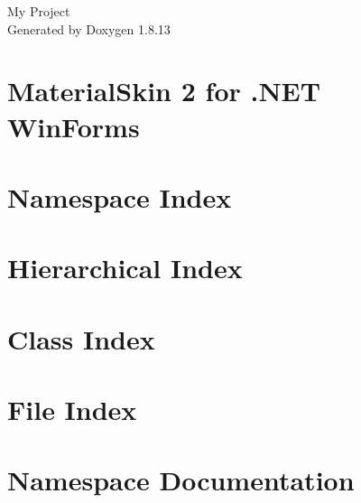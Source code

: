\documentclass[twoside]{book}
\newcommand{\+}{\discretionary{\mbox{\scriptsize$\hookleftarrow$}}{}{}}
\newcommand{\clearemptydoublepage}{%
  \newpage{\pagestyle{empty}\cleardoublepage}%
}
\begin{document}
\hypersetup{pageanchor=false,
             bookmarksnumbered=true,
             pdfencoding=unicode
            }
\begin{titlepage}
\vspace*{7cm}
\begin{center}%
{\Large My Project }\\
\vspace*{1cm}
{\large Generated by Doxygen 1.8.13}\\
\end{center}
\end{titlepage}
\clearemptydoublepage
{}
\tableofcontents
\clearemptydoublepage
{}
\hypersetup{pageanchor=true}

\chapter{Material\+Skin 2 for .N\+ET Win\+Forms}
\label{md__home_etud_babonneau_Documents_fdsfsdfqs_sae-2_801_src_newPizza_packages_MaterialSkin_82_82_83_81_README}

\chapter{Namespace Index}

\chapter{Hierarchical Index}

\chapter{Class Index}

\chapter{File Index}

\chapter{Namespace Documentation}













\end{document}
